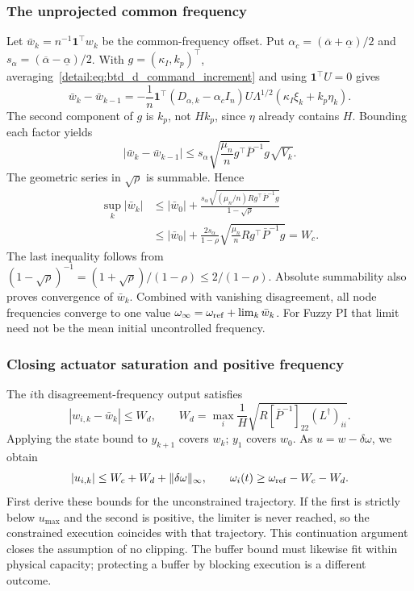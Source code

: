 \subsubsection{The unprojected common frequency}
Let $\bar w_k=n^{-1}\mathbf1^\top w_k$ be the common-frequency offset.
Put $\alpha_c=(\overline\alpha+\underline\alpha)/2$ and
$s_\alpha=(\overline\alpha-\underline\alpha)/2$. With
$g=(\kappa_I,k_p)^\top$, averaging~\eqref{detail:eq:btd_d_command_increment}
and using $\mathbf1^\top U=0$ gives
\begin{equation}
 \bar w_k-\bar w_{k-1}
 =-\frac1n\mathbf1^\top(D_{\alpha,k}-\alpha_c I_n)
 U\Lambda^{1/2}(\kappa_I\xi_k+k_p\eta_k).
 \label{detail:eq:btd_d_common_increment}
\end{equation}
The second component of $g$ is $k_p$, not $Hk_p$, since $\eta$ already
contains $H$. Bounding each factor yields
\begin{equation}
 |\bar w_k-\bar w_{k-1}|
 \le s_\alpha\sqrt{\frac{\mu_n}{n}g^\top\bar P^{-1}g}\sqrt{V_k}.
 \label{detail:eq:btd_d_common_step_bound}
\end{equation}
The geometric series in $\sqrt{\rho}$ is summable. Hence
\begin{align}
 \sup_k|\bar w_k|
 &\le |\bar w_0|+
 \frac{s_\alpha\sqrt{(\mu_n/n)R g^\top\bar P^{-1}g}}{1-\sqrt\rho}
 \nonumber\\
 &\le |\bar w_0|+\frac{2s_\alpha}{1-\rho}
 \sqrt{\frac{\mu_n}{n}R g^\top\bar P^{-1}g}=W_c.
 \label{detail:eq:btd_clock_bounds}
\end{align}
The last inequality follows from
$(1-\sqrt\rho)^{-1}=(1+\sqrt\rho)/(1-\rho)\le2/(1-\rho)$.
Absolute summability also proves convergence of $\bar w_k$. Combined with
vanishing disagreement, all node frequencies converge to one value
$\omega_\infty=\omega_{\rm ref}+\lim_k\bar w_k$.
For Fuzzy PI that limit need not be the mean initial uncontrolled frequency.

\subsubsection{Closing actuator saturation and positive frequency}
The $i$th disagreement-frequency output satisfies
\begin{equation}
 |w_{i,k}-\bar w_k|\le W_d,
 \qquad W_d=\max_i\frac1H
 \sqrt{R[\bar P^{-1}]_{22}(L^\dagger)_{ii}}.
 \label{detail:eq:btd_d_node_frequency}
\end{equation}
Applying the state bound to $y_{k+1}$ covers $w_k$; $y_1$ covers $w_0$.
As $u=w-\delta\omega$, we obtain
\begin{equation}
 |u_{i,k}|\le W_c+W_d+\|\delta\omega\|_\infty,
 \qquad \omega_i(t)\ge\omega_{\rm ref}-W_c-W_d.
 \label{detail:eq:btd_actuator_bounds}
\end{equation}
First derive these bounds for the unconstrained trajectory. If the first
is strictly below $u_{\max}$ and the second is positive, the limiter is
never reached, so the constrained execution coincides with that trajectory.
This continuation argument closes the assumption of no clipping. The
buffer bound must likewise fit within physical capacity; protecting a
buffer by blocking execution is a different outcome.

